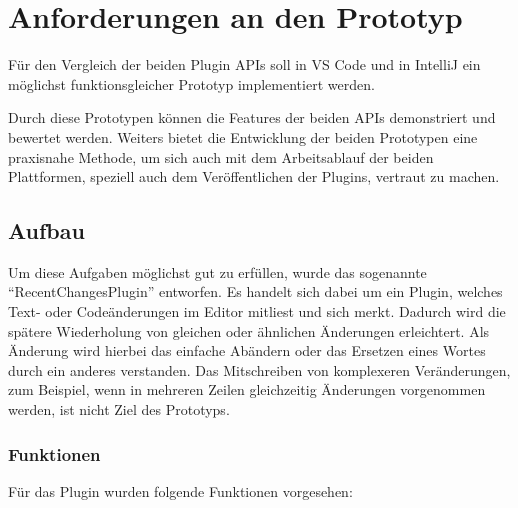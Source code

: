 \chapter{Anforderungen an den Prototyp}
\label{cha:Prototyp}

Für den Vergleich der beiden Plugin APIs soll 
in VS Code und in IntelliJ ein möglichst funktionsgleicher 
Prototyp implementiert werden.

Durch diese Prototypen können die Features der beiden APIs 
demonstriert und bewertet werden. Weiters bietet die Entwicklung
der beiden Prototypen
eine praxisnahe Methode, um sich auch mit dem Arbeitsablauf der
beiden Plattformen, speziell auch dem Veröffentlichen
der Plugins, vertraut zu machen.

\section{Aufbau}
\label{sec:Prototyp_Aufbau}

Um diese Aufgaben möglichst gut zu erfüllen, wurde das sogenannte
\enquote{RecentChangesPlugin} entworfen. Es handelt sich 
dabei um ein Plugin, welches Text- oder Codeänderungen 
im Editor mitliest und sich merkt. Dadurch wird die spätere
Wiederholung von gleichen oder ähnlichen Änderungen erleichtert. %
Als Änderung wird hierbei das einfache Abändern oder das Ersetzen eines
Wortes durch ein anderes verstanden. 
Das Mitschreiben von komplexeren Veränderungen, zum Beispiel, 
wenn in mehreren Zeilen gleichzeitig Änderungen vorgenommen 
werden, ist nicht Ziel des Prototyps.

\subsection{Funktionen}

Für das Plugin wurden folgende Funktionen vorgesehen:

